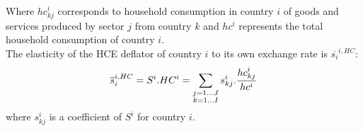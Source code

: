\documentclass[11pt,a4paper]{paper} %
\begin{document}
Where ${hc}_{kj}^i$ corresponds to household consumption in country $i$ of goods and services produced by sector $j$ from country $k$ and $hc^i$ represents the total household consumption of country $i$. \\
The elasticity of the HCE deflator of country $i$ to its own exchange rate is $\overline{s_{i}}^{i,HC}$:  
 \begin{eqnarray}
\overline{s}_{i}^{i,HC}=S^i.HC^i=\underset{\begin{subarray}{c}j=1\dots J \\ k=1 \dots I \end{subarray}}{\mathop \sum}\,{{s}_{kj}^i}.\frac{{hc}_{kj}^i}{hc^i}
\label{eq:eq6}
 \end{eqnarray} 
where ${s}_{kj}^i$ is a coefficient of $S^i$ for country $i$. 
\end{document}
